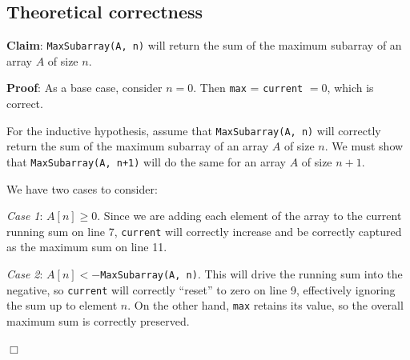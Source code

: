 \documentclass[a4paper,10pt]{article}
\begin{document}
\begin{samepage}
	\section{Theoretical correctness}
		{\bf Claim}: {\tt MaxSubarray(A, n)} will return the sum of the maximum subarray of an array $A$ of size $n$.

		{\bf Proof}: As a base case, consider $n=0$. Then {\tt max} = {\tt current} $= 0$, which is correct.

		For the inductive hypothesis, assume that {\tt MaxSubarray(A, n)} will correctly return the sum of the maximum subarray of an array $A$ of size $n$. We must show that {\tt MaxSubarray(A, n+1)} will do the same for an array $A$ of size $n+1$.
		
		We have two cases to consider:

		{\it Case 1}: $A[n] \geq 0$. Since we are adding each element of the array to the current running sum on line 7, {\tt current} will correctly increase and be correctly captured as the maximum sum on line 11.

		{\it Case 2}: $A[n] < -${\tt MaxSubarray(A, n)}. This will drive the running sum into the negative, so {\tt current} will correctly ``reset'' to zero on line 9, effectively ignoring the sum up to element $n$. On the other hand, {\tt max} retains its value, so the overall maximum sum is correctly preserved.

		\begin{center}
		$\Box$
		\end{center}

\end{samepage} 
\end{document}
